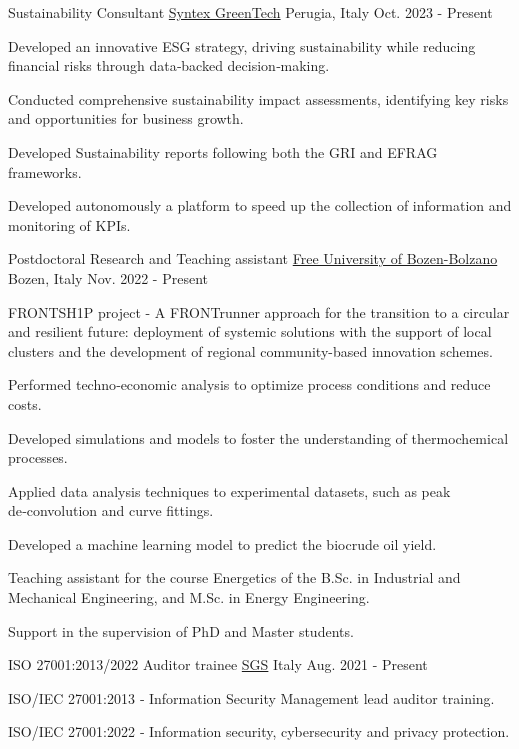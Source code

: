 
\begin{cventries}

\cventry
{Sustainability Consultant}
{\href{https://syntexgreen.tech}{Syntex GreenTech}}
{Perugia, Italy}
{Oct. 2023 - Present}
{\begin{cvitems}
\item {Developed an innovative ESG strategy, driving sustainability while reducing financial risks through data‑backed decision‑making.}
\item {Conducted comprehensive sustainability impact assessments, identifying key risks and opportunities for business growth.}
\item {Developed Sustainability reports following both the GRI and EFRAG frameworks.}
\item {Developed autonomously a platform to speed up the collection of information and monitoring of KPIs.}
\end{cvitems}}

\cventry
{Postdoctoral Research and Teaching assistant}
{\href{https://unibz.it}{Free University of Bozen-Bolzano}}
{Bozen, Italy}
{Nov. 2022 - Present}
{\begin{cvitems}
\item {FRONTSH1P project - A FRONTrunner approach for the transition to a circular and resilient future: deployment of systemic solutions with the support of local clusters and the development of regional community-based innovation schemes.}
\item {Performed techno‑economic analysis to optimize process conditions and reduce costs.}
\item {Developed simulations and models to foster the understanding of thermochemical processes.}
\item {Applied data analysis techniques to experimental datasets, such as peak de‑convolution and curve fittings.}
\item {Developed a machine learning model to predict the biocrude oil yield.}
\item {Teaching assistant for the course Energetics of the B.Sc. in Industrial and Mechanical Engineering, and M.Sc. in Energy Engineering.}
\item {Support in the supervision of PhD and Master students.}
\end{cvitems}}

\cventry
{ISO 27001:2013/2022 Auditor trainee}
{\href{https://sgs.com}{SGS}}
{Italy}
{Aug. 2021 - Present}
{\begin{cvitems}
\item {ISO/IEC 27001:2013 ‑ Information Security Management lead auditor training.}
\item {ISO/IEC 27001:2022 ‑ Information security, cybersecurity and privacy protection.}
\end{cvitems}}


\end{cventries}
